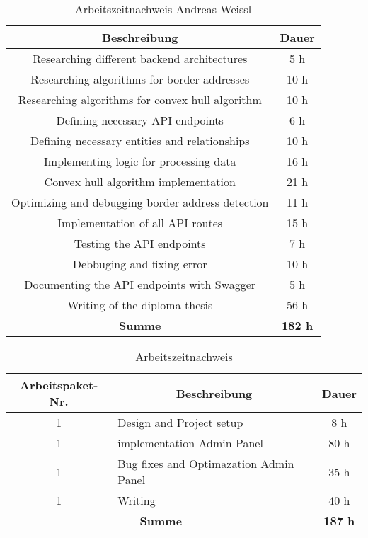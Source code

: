 \begin{table}[h!]
  \centering
  \begin{tabular}{|c|c|}
  \hline
  \multicolumn{1}{|c|}{\textbf{Beschreibung}}  &
  \multicolumn{1}{c|}{\textbf{Dauer}}  \\ \hline
    Researching different backend architectures & 5 h \\ \hline
    Researching algorithms for border addresses & 10 h \\ \hline
    Researching algorithms for convex hull algorithm & 10 h \\ \hline
    Defining necessary API endpoints & 6 h \\ \hline
    Defining necessary entities and relationships & 10 h \\ \hline
    Implementing logic for processing data & 16 h \\ \hline
    Convex hull algorithm implementation & 21 h \\ \hline
    Optimizing and debugging border address detection & 11 h \\ \hline
    Implementation of all API routes & 15 h \\ \hline
    Testing the API endpoints & 7 h \\ \hline
    Debbuging and fixing error & 10 h \\ \hline
    Documenting the API endpoints with Swagger & 5 h \\ \hline
    Writing of the diploma thesis & 56 h \\ \hline
    {\textbf{Summe}} & \textbf{182 h} \\ \hline
   \end{tabular}
  \caption{Arbeitszeitnachweis Andreas Weissl}
  \end{table}

  
\begin{table}
  \centering
\begin{tabular}{|c|l|c|}
\hline
\multicolumn{1}{|c|}{\textbf{Arbeitspaket-Nr.}} &
\multicolumn{1}{c|}{\textbf{Beschreibung}}  &
\multicolumn{1}{c|}{\textbf{Dauer}}  \\ \hline
  1 & Design and Project setup & 8 h \\ \hline
  1 & implementation Admin Panel & 80 h \\ \hline
  1 & Bug fixes and Optimazation Admin Panel & 35 h \\ \hline
  1 & Writing & 40 h \\ \hline



  
  \multicolumn{2}{|c|}{\textbf{Summe}} & \textbf{187 h} \\ \hline
 \end{tabular}
\caption{Arbeitszeitnachweis}
\end{table}

\newpage




 
